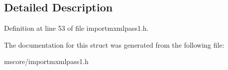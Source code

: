 \subsection{Detailed Description}


Definition at line 53 of file importmxmlpass1.\+h.



The documentation for this struct was generated from the following file\+:\begin{DoxyCompactItemize}
\item 
mscore/importmxmlpass1.\+h\end{DoxyCompactItemize}
